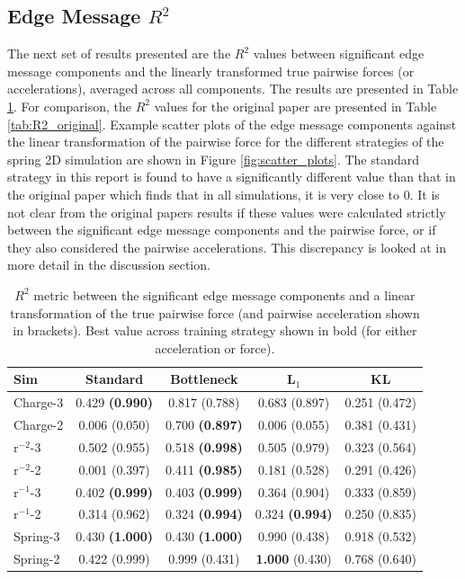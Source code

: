 \documentclass[11pt]{article}
\begin{document}
\subsection{Edge Message $R^2$}
The next set of results presented are the $R^2$ values between significant edge message components and the linearly transformed true pairwise forces (or accelerations), averaged across all components. The results are presented in Table \ref{tab:R2}. For comparison, the $R^2$ values for the original paper are presented in Table \ref{tab:R2_original}. Example scatter plots of the edge message components against the linear transformation of the pairwise force for the different strategies of the spring 2D simulation are shown in Figure \ref{fig:scatter_plots}. The standard strategy in this report is found to have a significantly different value than that in the original paper which finds that in all simulations, it is very close to 0. It is not clear from the original papers results if these values were calculated strictly between the significant edge message components and the pairwise force, or if they also considered the pairwise accelerations. This discrepancy is looked at in more detail in the discussion section.
    \begin{table}[H]
        \centering
        \begin{tabular}{lcccc}
        \hline
        Sim & Standard & Bottleneck & L$_1$ & KL \\
        \hline
        Charge-3 & 0.429 \textbf{(0.990)} & 0.817 (0.788) & 0.683 (0.897) & 0.251 (0.472) \\
        Charge-2 & 0.006 (0.050) & 0.700 \textbf{(0.897)} & 0.006 (0.055) & 0.381 (0.431)\\
        r$^{-2}$-3 & 0.502 (0.955) & 0.518 \textbf{(0.998)} & 0.505 (0.979) & 0.323 (0.564) \\
        r$^{-2}$-2 & 0.001 (0.397) & 0.411 \textbf{(0.985)} & 0.181 (0.528) & 0.291 (0.426) \\
        r$^{-1}$-3 & 0.402 \textbf{(0.999)} & 0.403 \textbf{(0.999)} & 0.364 (0.904) & 0.333 (0.859)\\
        r$^{-1}$-2 & 0.314 (0.962) & 0.324 \textbf{(0.994)} & 0.324 \textbf{(0.994)} & 0.250 (0.835) \\
        Spring-3 & 0.430 \textbf{(1.000)}& 0.430 \textbf{(1.000)} & 0.990 (0.438) & 0.918 (0.532)\\
        Spring-2 & 0.422 (0.999) & 0.999 (0.431) & \textbf{1.000} (0.430) & 0.768 (0.640) \\

        \hline
        \end{tabular}
        \caption{$R^2$ metric between the significant edge message components and a linear transformation of the true pairwise force (and pairwise acceleration shown in brackets). Best value across training strategy shown in bold (for either acceleration or force).}
        \label{tab:R2}
    \end{table}
\end{document}
